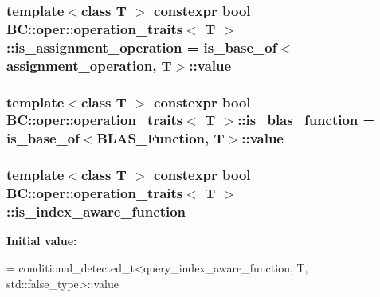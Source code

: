 \subsubsection[{\texorpdfstring{is\+\_\+assignment\+\_\+operation}{is_assignment_operation}}]{\setlength{\rightskip}{0pt plus 5cm}template$<$class T $>$ constexpr bool {\bf B\+C\+::oper\+::operation\+\_\+traits}$<$ T $>$\+::is\+\_\+assignment\+\_\+operation = is\+\_\+base\+\_\+of$<${\bf assignment\+\_\+operation}, T$>$\+::value\hspace{0.3cm}{\ttfamily [static]}}\hypertarget{structBC_1_1oper_1_1operation__traits_a34a6f667b82f184311447df43428cbda}{}\label{structBC_1_1oper_1_1operation__traits_a34a6f667b82f184311447df43428cbda}
\subsubsection[{\texorpdfstring{is\+\_\+blas\+\_\+function}{is_blas_function}}]{\setlength{\rightskip}{0pt plus 5cm}template$<$class T $>$ constexpr bool {\bf B\+C\+::oper\+::operation\+\_\+traits}$<$ T $>$\+::is\+\_\+blas\+\_\+function = is\+\_\+base\+\_\+of$<${\bf B\+L\+A\+S\+\_\+\+Function}, T$>$\+::value\hspace{0.3cm}{\ttfamily [static]}}\hypertarget{structBC_1_1oper_1_1operation__traits_afda2219c317e3396f38f2664ad14013a}{}\label{structBC_1_1oper_1_1operation__traits_afda2219c317e3396f38f2664ad14013a}
\subsubsection[{\texorpdfstring{is\+\_\+index\+\_\+aware\+\_\+function}{is_index_aware_function}}]{\setlength{\rightskip}{0pt plus 5cm}template$<$class T $>$ constexpr bool {\bf B\+C\+::oper\+::operation\+\_\+traits}$<$ T $>$\+::is\+\_\+index\+\_\+aware\+\_\+function\hspace{0.3cm}{\ttfamily [static]}}\hypertarget{structBC_1_1oper_1_1operation__traits_a4cbbac5d3e310a2ee631b565645ea850}{}\label{structBC_1_1oper_1_1operation__traits_a4cbbac5d3e310a2ee631b565645ea850}
{\bfseries Initial value\+:}
\begin{DoxyCode}
=
            conditional\_detected\_t<query\_index\_aware\_function, T, std::false\_type>::value
\end{DoxyCode}
